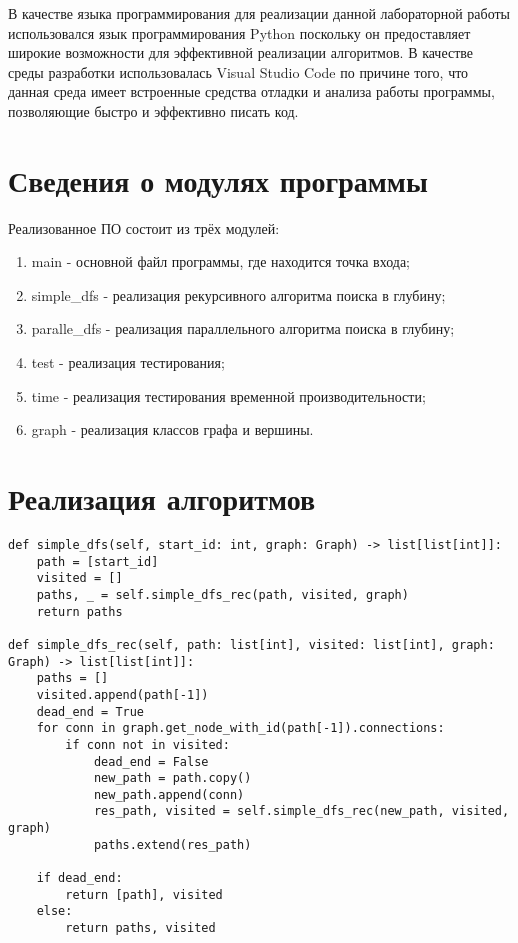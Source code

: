 В качестве языка программирования для реализации данной лабораторной работы использовался язык программирования Python поскольку он предоставляет широкие возможности для эффективной реализации алгоритмов. В качестве среды разработки использовалась Visual Studio Code по причине того, что данная среда имеет встроенные средства отладки и анализа работы программы, позволяющие быстро и эффективно писать код.

\section{Сведения о модулях программы}

Реализованное ПО состоит из трёх модулей:
\begin{enumerate}
	\item main - основной файл программы, где находится точка входа;
	\item simple\_dfs - реализация рекурсивного алгоритма поиска в глубину;
	\item paralle\_dfs - реализация параллельного алгоритма поиска в глубину;
	\item test - реализация тестирования;
	\item time - реализация тестирования временной производительности;
	\item graph - реализация классов графа и вершины.
\end{enumerate}

\section{Реализация алгоритмов}

\begin{lstlisting}[label=some-code-1,caption=Реализация алгоритма поиска в глубину]
def simple_dfs(self, start_id: int, graph: Graph) -> list[list[int]]:
    path = [start_id]
    visited = []
    paths, _ = self.simple_dfs_rec(path, visited, graph)
    return paths

def simple_dfs_rec(self, path: list[int], visited: list[int], graph: Graph) -> list[list[int]]:
    paths = []
    visited.append(path[-1])
    dead_end = True
    for conn in graph.get_node_with_id(path[-1]).connections:
        if conn not in visited:
            dead_end = False
            new_path = path.copy()
            new_path.append(conn)
            res_path, visited = self.simple_dfs_rec(new_path, visited, graph)
            paths.extend(res_path)
            
    if dead_end:
        return [path], visited
    else:
        return paths, visited
\end{lstlisting}

